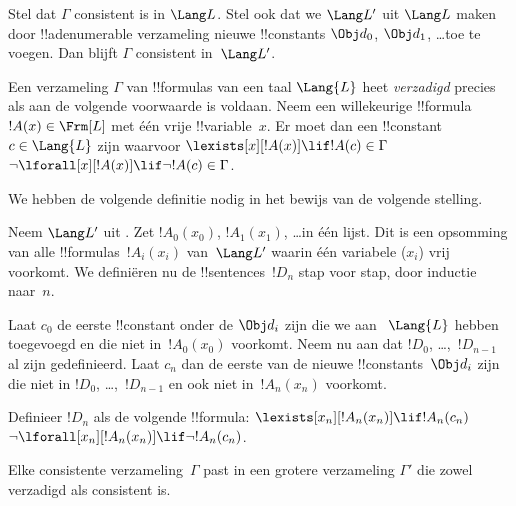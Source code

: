 \documentclass[openany]{memoir}
\begin{document}
\begin{prop}
Stel dat $\Gamma$ consistent is in $\Lang L$. Stel ook dat we $\Lang L'$
uit $\Lang L$ maken door !!a{denumerable} verzameling nieuwe
!!{constant}s $\Obj d_0$, $\Obj d_1$, \dots toe te voegen. Dan blijft
$\Gamma$ consistent in~$\Lang L'$.
\end{prop}

\begin{defn}
Een verzameling $\Gamma$ van !!{formula}s van een taal $\Lang {L}$ heet
\emph{verzadigd} precies als aan de volgende voorwaarde is voldaan. Neem
een willekeurige !!{formula}~$!A(x) \in \Frm[L]$ met één vrije
!!{variable}~$x$. Er moet dan een !!{constant}~$c \in \Lang{L}$ zijn
waarvoor
      {$\lexists[x][!A(x)] \lif !A(c) \in \Gamma$}
      {$\lnot\lforall[x][!A(x)] \lif \lnot !A(c) \in \Gamma$}.
\end{defn}

We hebben de volgende definitie nodig in het bewijs van de volgende
stelling.

\begin{defn}
Neem $\Lang L'$ uit . Zet $!A_0(x_0)$,
$!A_1(x_1)$, \dots in één lijst. Dit is een opsomming van alle
!!{formula}s~$!A_i(x_i)$ van~$\Lang L'$ waarin één variabele ($x_i$)
vrij voorkomt. We definiëren nu de !!{sentence}s~$!D_n$ stap voor stap,
door inductie naar~$n$.

Laat $c_0$ de eerste !!{constant} onder de $\Obj d_i$ zijn die we aan
~$\Lang{L}$ hebben toegevoegd en die niet in~$!A_0(x_0)$ voorkomt. Neem
nu aan dat $!D_0$, \dots,~$!D_{n-1}$ al zijn gedefinieerd. Laat $c_n$
dan de eerste van de nieuwe !!{constant}s~$\Obj d_i$ zijn die niet in
$!D_0$, \dots,~$!D_{n-1}$ en ook niet in~$!A_n(x_n)$ voorkomt.

Definieer $!D_{n}$ als de volgende !!{formula}: 
{$\lexists[x_{n}][!A_{n}(x_{n})] \lif
  !A_{n}(c_{n})$}{$\lnot\lforall[x_{n}][!A_{n}(x_{n})] \lif \lnot
  !A_{n}(c_{n})$}.
\end{defn}

\begin{lem}
Elke consistente verzameling~$\Gamma$ past in een grotere verzameling
$\Gamma'$ die zowel verzadigd als consistent is.
\end{lem}
\end{document}
